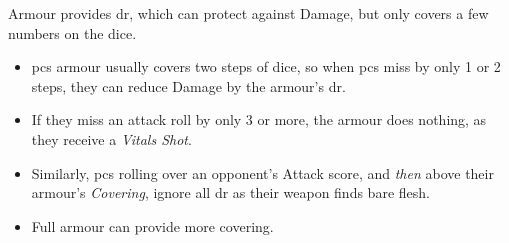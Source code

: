 Armour provides \gls{dr}, which can protect against Damage, but only covers a few numbers on the dice.

\begin{itemize}
  \item
  \Glspl{pc} armour usually covers two steps of dice, so when \glspl{pc} miss by only 1 or 2 steps, they can reduce Damage by the armour's \gls{dr}.
  \item
  If they miss an attack roll by only 3 or more, the armour does nothing, as they receive a \textit{Vitals Shot}.
  \item
  Similarly, \glspl{pc} rolling over an opponent's Attack score, and \emph{then} above their armour's \textit{Covering}, ignore all \gls{dr} as their weapon finds bare flesh.
  \item
  Full armour can provide more covering.
\end{itemize}

